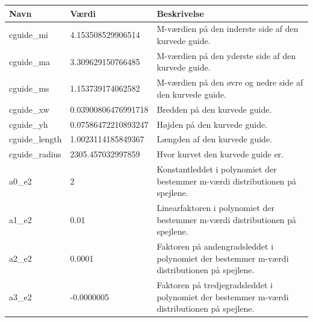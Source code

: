 \documentclass[12pt,oneside,a4paper]{article}
\begin{document}
{{{{{\begin{tabularx}{\textwidth}{l|l|X}
\end{tabularx}



\begin{tabularx}{\textwidth}{l|l|X}
    Navn           & Værdi                & Beskrivelse                                                                                                     \\
    \hline
    \hline
cguide\_mi     & 4.153508529906514    & M-værdien på den inderste side af den kurvede guide.                                                            \\
\hline
cguide\_ma     & 3.309629150766485    & M-værdien på den yderste side af den kurvede guide.                                                             \\
\hline
cguide\_ms     & 1.153739174062582    & M-værdien på den øvre og nedre side af den kurvede guide.                                                       \\
\hline
cguide\_xw     & 0.03900806476991718  & Bredden på den kurvede guide.                                                                                   \\
\hline
cguide\_yh     & 0.07586472210893247  & Højden på den kurvede guide.                                                                                    \\
\hline
cguide\_length & 1.0023114185849367   & Længden af den kurvede guide.                                                                                   \\
\hline
cguide\_radius & 2305.457032997859    & Hvor kurvet den kurvede guide er.                                                                               \\
\hline
a0\_e2         & 2                    & Konstantleddet i polynomiet der bestemmer m-værdi distributionen på spejlene.                                   \\
\hline
a1\_e2         & 0.01                 & Linearfaktoren i polynomiet der bestemmer m-værdi distributionen på spejlene.                                   \\
\hline
a2\_e2         & 0.0001               & Faktoren på andengradsleddet i polynomiet der bestemmer m-værdi distributionen på spejlene.                     \\
\hline
a3\_e2         & -0.0000005           & Faktoren på tredjegradsleddet i polynomiet der bestemmer m-værdi distributionen på spejlene.                    \\

\end{tabularx}}}}}}
\end{document}
